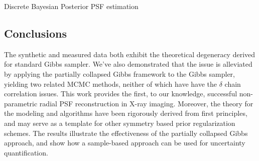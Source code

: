 \begin{chapter}{Discrete Bayesian Posterior PSF estimation}
\subsection{Conclusions} \label{sec:Conclusions}

The synthetic and measured data both exhibit the theoretical degeneracy derived \cite{AgaBarPapStu} for standard Gibbs sampler.
We've also demonstrated that the issue is alleviated by applying the partially collapsed Gibbs framework to the Gibbs sampler, yielding two related MCMC methods, neither of which have have the $\delta$ chain correlation issues. 
This work provides the first, to our knowledge, successful non-parametric radial PSF reconstruction in X-ray imaging. 
Moreover, the theory for the modeling and algorithms have been rigorously derived from first principles, and may serve as a template for other symmetry based prior regularization schemes.
The results illustrate the effectiveness of the partially collapsed Gibbs approach, and show how a sample-based approach can be used for uncertainty quantification.
\end{chapter}
